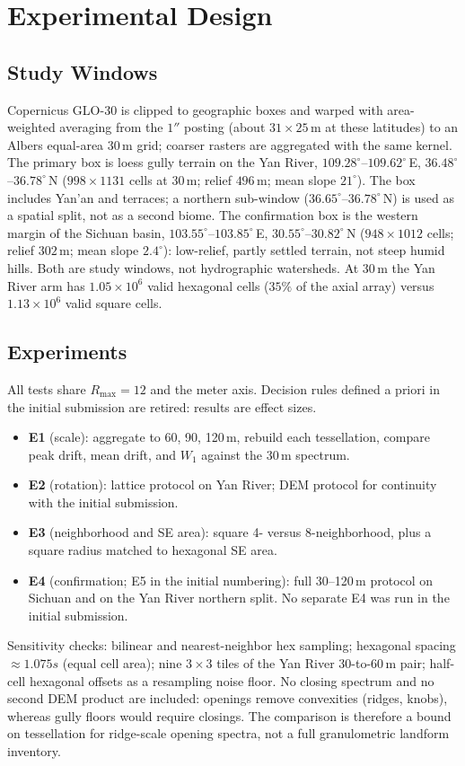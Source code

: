 \documentclass[journal]{IEEEtran}
\newif\ifhighlight
\newcommand{\rev}[1]{\ifhighlight\textcolor{blue}{#1}\else#1\fi}
\begin{document}
\section{Experimental Design}
\label{sec:exp}

\subsection{Study Windows}
Copernicus GLO-30 is clipped to geographic boxes and warped with
area-weighted averaging from the \(1''\) posting (about \(31\times 25\,\mathrm{m}\)
at these latitudes) to an Albers equal-area 30\,m grid; coarser rasters are
aggregated with the same kernel.
The primary box is loess gully terrain on the Yan River,
\(109.28^\circ\)--\(109.62^\circ\)\,E, \(36.48^\circ\)--\(36.78^\circ\)\,N
(\(998\times 1131\) cells at 30\,m; relief \(496\,\mathrm{m}\); mean slope
\(21^\circ\)).
\rev{The box includes Yan'an and terraces; a northern sub-window
(\(36.65^\circ\)--\(36.78^\circ\)\,N) is used as a spatial split, not as a
second biome.}
The confirmation box is the western margin of the Sichuan basin,
\(103.55^\circ\)--\(103.85^\circ\)\,E, \(30.55^\circ\)--\(30.82^\circ\)\,N
(\(948\times 1012\) cells; relief \(302\,\mathrm{m}\); mean slope \(2.4^\circ\)):
\rev{low-relief, partly settled terrain, not steep humid hills.}
Both are study windows, not hydrographic watersheds.
\rev{At 30\,m the Yan River arm has \(1.05\times 10^6\) valid hexagonal cells
(\(35\%\) of the axial array) versus \(1.13\times 10^6\) valid square cells.}

\subsection{Experiments}
All tests share \(R_{\max}=12\) and the meter axis.
\rev{Decision rules defined a priori in the initial submission are retired:
results are effect sizes.}
\begin{itemize}
\item \textbf{E1} (scale): aggregate to 60, 90, 120\,m, rebuild each tessellation,
compare peak drift, mean drift, and \(W_1\) against the 30\,m spectrum.
\item \textbf{E2} (rotation): lattice protocol on Yan River; DEM protocol for
continuity with the initial submission.
\item \textbf{E3} (neighborhood and SE area): square 4- versus 8-neighborhood,
plus a square radius matched to hexagonal SE area.
\item \textbf{E4} (confirmation; E5 in the initial numbering): full 30--120\,m
protocol on Sichuan and on the Yan River northern split. No separate E4 was
run in the initial submission.
\end{itemize}
\rev{Sensitivity checks: bilinear and nearest-neighbor hex sampling; hexagonal
spacing \(\approx 1.075s\) (equal cell area); nine \(3\times 3\) tiles of the
Yan River 30-to-60\,m pair; half-cell hexagonal offsets as a resampling noise
floor.}
No closing spectrum and no second DEM product are included: openings remove
convexities (ridges, knobs), whereas gully floors would require closings.
The comparison is therefore a bound on tessellation for ridge-scale opening
spectra, not a full granulometric landform inventory.
\end{document}
